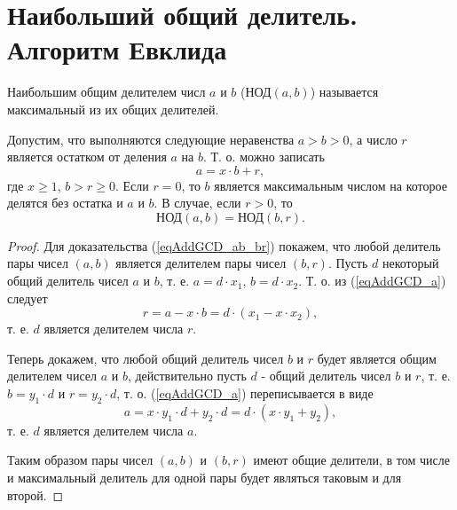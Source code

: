 \section{Наибольший общий делитель. Алгоритм Евклида}
\label{AddEuclidean}
\begin{definition}
Наибольшим общим делителем числ $a$ и $b$ ($\mbox{НОД}\left(a,
b\right)$) называется максимальный из их общих делителей.
\label{defAddGCD}
\end{definition}

\begin{theorem}
Допустим, что выполняются следующие неравенства
$a > b > 0$, а число $r$ является остатком от деления $a$ на
$b$. Т. о. можно записать 
\begin{equation}
a = x \cdot b + r,
\label{eqAddGCD_a}
\end{equation}
где $x \ge 1$, $b > r \ge 0$. Если $r=0$, то $b$ является максимальным числом на
которое делятся без остатка и $a$ и $b$. В случае, если $r > 0$, то
\begin{equation}
\mbox{НОД}\left(a, b\right) = \mbox{НОД}\left(b, r\right).
\label{eqAddGCD_ab_br}
\end{equation}
\end{theorem}

\begin{proof}
Для доказательства (\ref{eqAddGCD_ab_br}) покажем, что любой делитель
пары чисел $\left(a,b\right)$  является делителем пары чисел
$\left(b,r\right)$. Пусть $d$ некоторый общий делитель чисел  $a$ и
$b$, т. е. $a = d \cdot x_1$, $b = d \cdot x_2$. Т. о. из (\ref{eqAddGCD_a}) следует
\begin{equation}
r = a - x \cdot b = 
d \cdot \left( x_1 - x \cdot x_2 \right),
\nonumber
\end{equation}
т. е. $d$ является делителем числа $r$.

Теперь докажем, что любой общий делитель чисел $b$ и $r$ будет является общим
делителем чисел $a$ и $b$, действительно пусть $d$ - общий делитель
чисел $b$ и $r$, т. е. $b = y_1 \cdot d$ и  $r = y_2 \cdot d$,
т. о. (\ref{eqAddGCD_a}) переписывается в виде
\begin{equation}
a = x \cdot y_1 \cdot d + y_2 \cdot d = d \cdot \left( x \cdot y_1 +
y_2 \right),
\nonumber
\end{equation}
т. е. $d$ является делителем числа $a$.

Таким образом пары чисел  $\left(a,b\right)$  и $\left(b,r\right)$
имеют общие делители, в том числе и максимальный делитель для одной
пары будет являться таковым и для второй.  
\end{proof}


